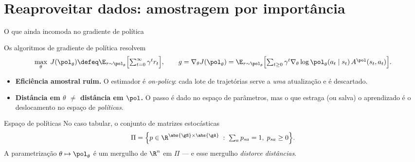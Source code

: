 \documentclass[aspectratio=169, 10pt]{beamer}
\newcommand{\thv}{\theta}
\newcommand{\polth}{\pol_{\thv}}
\newcommand{\gth}{\nabla_{\thv}}
\newcommand{\traj}{\tau}
\newcommand{\Advpi}{A^{\pol}}
\begin{document}
\section{Reaproveitar dados: amostragem por importância}

\begin{frame}{O que ainda incomoda no gradiente de política}

  Os algoritmos de gradiente de política resolvem
  \[
    \max_{\thv} \; J(\polth) \defeq \E_{\traj \sim \polth}
      \Bigl[\textstyle\sum_{t=0}^{\infty} \gamma^t r_t\Bigr],
    \qquad
    g = \gth J(\polth) = \E_{\traj\sim\polth}
      \Bigl[\textstyle\sum_{t\ge 0}\gamma^t \gth \log \polth(a_t\mid s_t)\,\Advpi(s_t,a_t)\Bigr].
  \]

  \begin{itemize}\setlength{\itemsep}{0.35ex}
    \item \textbf{Eficiência amostral ruim.} O estimador é \emph{on-policy}: cada
      lote de trajetórias serve a \emph{uma} atualização e é descartado.
    \item \textbf{Distância em $\thv$ $\neq$ distância em $\pol$.} O passo é dado
      no espaço de parâmetros, mas o que estraga (ou salva) o aprendizado é o
      deslocamento no espaço de \emph{políticas}.
  \end{itemize}

  \begin{defbox}{Espaço de políticas}
    No caso tabular, o conjunto de matrizes estocásticas
    \[
      \Pi = \Bigl\{ p \in \R^{\abs{\gS}\times\abs{\gA}} \;:\;
        \textstyle\sum_a p_{sa} = 1,\; p_{sa}\ge 0 \Bigr\}.
    \]
    A parametrização $\thv \mapsto \polth$ é um mergulho de $\R^n$ em $\Pi$ --- e
    esse mergulho \emph{distorce distâncias}.
  \end{defbox}
\end{frame}
\end{document}
